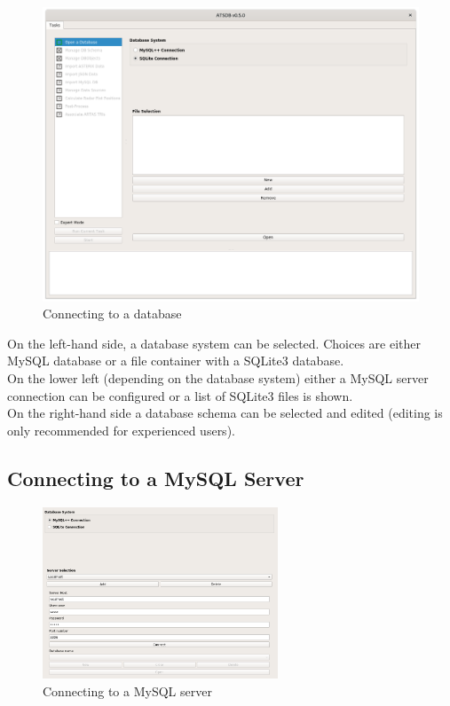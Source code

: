 \begin{figure}[H]
  \hspace*{-2cm}
    \includegraphics[width=18cm,frame]{../screenshots/db_config_connect.png}
  \caption{Connecting to a database}
  \label{fig:db_connect}
\end{figure}

On the left-hand side, a database system can be selected.  Choices are either MySQL database or a file container with a SQLite3 database. \\
On the lower left (depending on the database system) either a MySQL server connection can be configured or a list of SQLite3 files is shown.\\

On the right-hand side a database schema can be selected and edited (editing is only recommended for experienced users).

\subsection{Connecting to a MySQL Server}

\begin{figure}[H]
  \center
    \includegraphics[width=7cm,frame]{../screenshots/mysql_server_selection.png}
  \caption{Connecting to a MySQL server}
  \label{fig:mysql_connect}
\end{figure}

